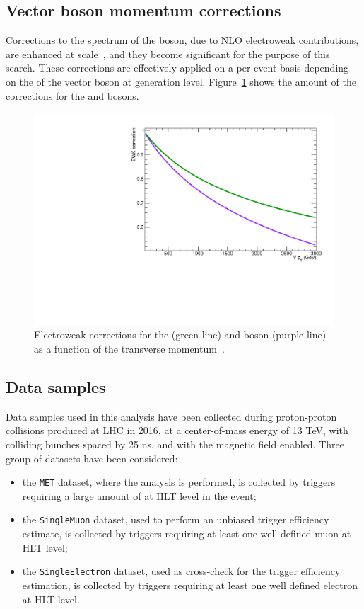 
\subsection{Vector boson momentum corrections}


Corrections to the \pt spectrum of the \V boson, due to NLO electroweak contributions, are enhanced at \TeV scale~\cite{Kallweit:2015fta}, and they become significant for the purpose of this search. These corrections are effectively applied on a per-event basis depending on the \pt of the vector boson at generation level. Figure~\ref{fig:ewk} shows the amount of the corrections for the \W and \Z bosons.

\begin{figure}[!htb]
 \centering
   \includegraphics[width=.5\textwidth]{figures/EWK.pdf}
 \caption{Electroweak corrections for the \Z (green line) and \W boson (purple line) as a function of the transverse momentum~\cite{Kallweit:2015fta}.}
 \label{fig:ewk}
\end{figure}



\subsection{Data samples}
\label{sec:data}

Data samples used in this analysis have been collected during proton-proton collisions produced at LHC in 2016, at a center-of-mass energy of 13 TeV, with colliding bunches spaced by 25 ns, and with the magnetic field enabled. Three group of datasets have been considered:
\begin{itemize}
\item the {\tt MET} dataset, where the analysis is performed, is collected by triggers requiring a large amount of \met at HLT level in the event;
\item the {\tt SingleMuon} dataset, used to perform an unbiased trigger efficiency estimate, is collected by triggers requiring at least one well defined muon at HLT level;
\item the {\tt SingleElectron} dataset, used as cross-check for the trigger efficiency estimation, is collected by triggers requiring at least one well defined electron at HLT level.
\end{itemize}

